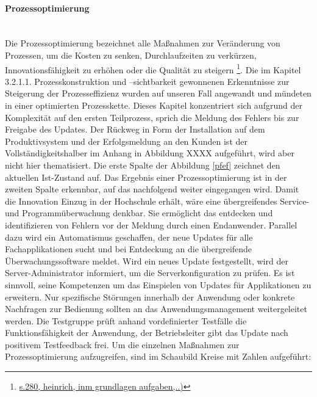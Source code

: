 \documentclass[a4paper, 12pt]{scrreprt}
\begin{document}
\paragraph{Prozessoptimierung}\mbox{}\\
Die Prozessoptimierung bezeichnet alle Maßnahmen zur Veränderung von Prozessen, um die Kosten zu senken, Durchlaufzeiten zu verkürzen, Innovationsfähigkeit zu erhöhen oder die Qualität zu steigern \footnote{\url{s.280, heinrich, inm grundlagen aufgaben,..)}}. 
Die im Kapitel 3.2.1.1. Prozesskonstruktion und –sichtbarkeit gewonnenen Erkenntnisse zur Steigerung der Prozesseffizienz wurden auf unseren Fall angewandt und mündeten in einer optimierten Prozesskette. Dieses Kapitel konzentriert sich aufgrund der Komplexität auf den ersten Teilprozess, sprich die Meldung des Fehlers bis zur Freigabe des Updates. Der Rückweg in Form der Installation auf dem Produktivsystem und der Erfolgsmeldung an den Kunden ist der Vollständigkeitshalber im Anhang in Abbildung XXXX aufgeführt, wird aber nicht hier thematisiert. 
Die erste Spalte der Abbildung \ref{pfef} zeichnet den aktuellen Ist-Zustand auf. Das Ergebnis einer Prozessoptimierung ist in der zweiten Spalte erkennbar, auf das nachfolgend weiter eingegangen wird. Damit die Innovation Einzug in der Hochschule erhält, wäre eine übergreifendes Service- und Programmüberwachung denkbar. Sie ermöglicht das entdecken und identifizieren von Fehlern vor der Meldung durch einen Endanwender. Parallel dazu wird ein Automatismus geschaffen, der neue Updates für alle Fachapplikationen sucht und bei Entdeckung an die übergreifende Überwachungssoftware meldet. Wird ein neues Update festgestellt, wird der Server-Administrator informiert, um die Serverkonfiguration zu prüfen. Es ist sinnvoll, seine Kompetenzen um das Einspielen von Updates für Applikationen zu erweitern. Nur spezifische Störungen innerhalb der Anwendung oder konkrete Nachfragen zur Bedienung sollten an das Anwendungsmanagement weitergeleitet werden.  Die Testgruppe prüft anhand vordefinierter Testfälle die Funktionsfähigkeit der Anwendung, der Betriebsleiter gibt das Update nach positivem Testfeedback frei.
Um die einzelnen Maßnahmen zur Prozessoptimierung aufzugreifen, sind im Schaubild Kreise mit Zahlen aufgeführt:
\end{document}
